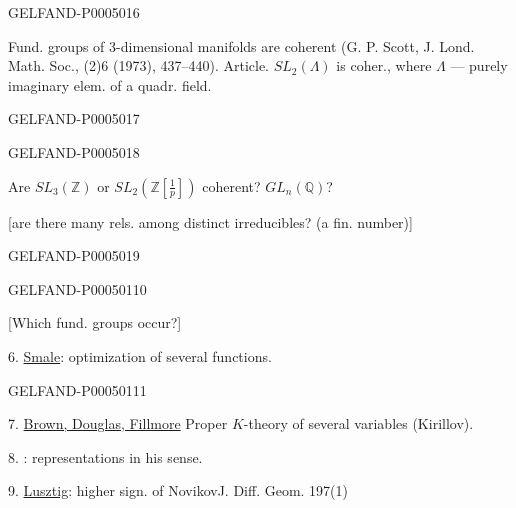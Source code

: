 \begin{GelfandAdjacentEvidence}{GELFAND-P000501}{6}

Fund. groups of 3-dimensional manifolds are coherent
(G. P. Scott, J. Lond. Math. Soc., (2)6 (1973), 437--440). Article.
$SL_2(\Lambda)$ is coher., where $\Lambda$ — purely imaginary elem. of a quadr. field.
\end{GelfandAdjacentEvidence}
\begin{GelfandAdjacentEvidence}{GELFAND-P000501}{7}

\end{GelfandAdjacentEvidence}
\begin{GelfandAdjacentEvidence}{GELFAND-P000501}{8}


Are $SL_3(\mathbb Z)$ or $SL_2(\mathbb Z[\frac1p])$ coherent?
$GL_n(\mathbb Q)$?

[are there many rels. among distinct irreducibles? (a fin. number)]
\end{GelfandAdjacentEvidence}
\begin{GelfandAdjacentEvidence}{GELFAND-P000501}{9}

\end{GelfandAdjacentEvidence}
\begin{GelfandAdjacentEvidence}{GELFAND-P000501}{10}


[Which fund. groups occur?]

6. \uline{Smale}: optimization of several functions.
\end{GelfandAdjacentEvidence}
\begin{GelfandAdjacentEvidence}{GELFAND-P000501}{11}


7. \uline{Brown, Douglas, Fillmore} \quad Proper $K$-theory of several variables (Kirillov).

8. : representations in his sense.

9. \uline{Lusztig}: higher sign. of Novikov\qquad J. Diff. Geom. 197(1)
\end{GelfandAdjacentEvidence}
